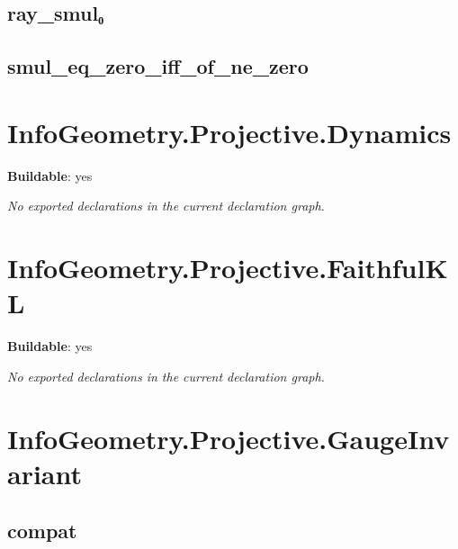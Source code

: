 \begin{theorem}[blueprint="infogeometry:projective:ray_smul"]
\end{theorem}

\subsection*{ray_smul₀}

\begin{theorem}[blueprint="infogeometry:projective:ray_smul₀"]
\end{theorem}

\subsection*{smul_eq_zero_iff_of_ne_zero}

\begin{theorem}[blueprint="infogeometry:projective:smul_eq_zero_iff_of_ne_zero"]
\end{theorem}

\section{InfoGeometry.Projective.Dynamics}

\noindent\textbf{Buildable}: yes

\noindent\emph{No exported declarations in the current declaration graph.}

\section{InfoGeometry.Projective.FaithfulKL}

\noindent\textbf{Buildable}: yes

\noindent\emph{No exported declarations in the current declaration graph.}

\section{InfoGeometry.Projective.GaugeInvariant}

\subsection*{compat}

\begin{theorem}[blueprint="infogeometry:projective:gaugeinvariant:compat"]
\end{theorem}

